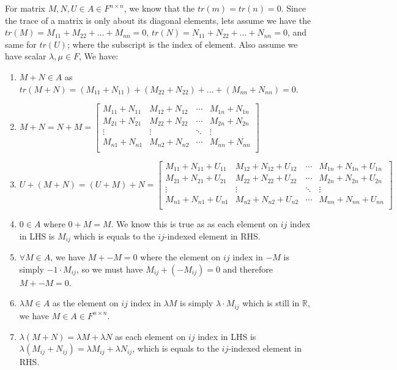 \documentclass[11pt]{article}
\begin{document}
For matrix $M, N, U \in A \in F^{n \times n}$, we know that the $tr(m) = tr(n) = 0$. Since the trace of a matrix is only about its diagonal elements, lets assume we have the $tr(M) = M_{11} + M_{22} + ... +  M_{nn} = 0$, $tr(N) = N_{11} + N_{22} + ... +  N_{nn} = 0$, and same for $tr(U)$; where the subscript is the index of element. Also assume we have scalar $\lambda, \mu \in F$, We have:

\begin{enumerate}
    \item $M + N \in A$ as $tr(M + N) = (M_{11} + N_{11}) + (M_{22} + N_{22}) +  ... + (M_{nn} + N_{nn}) = 0$.
    \item $M + N = N + M = \begin{bmatrix}
        M_{11} + N_{11} & M_{12} + N_{12} & \cdots &M_{1n} + N_{1n} \\
        M_{21} + N_{21} & M_{22} + N_{22} & \cdots &M_{2n} + N_{2n} \\
        \vdots & \vdots & \ddots & \vdots \\
        M_{n1} + N_{n1} & M_{n2} + N_{n2} & \cdots &M_{nn} + N_{nn} \\
    \end{bmatrix}$
    \item $U + (M + N) = (U + M) + N = \begin{bmatrix}
        M_{11} + N_{11}+ U_{11} & M_{12} + N_{12}+ U_{12} & \cdots & M_{1n} + N_{1n}+ U_{1n} \\
        M_{21} + N_{21} + U_{21} & M_{22} + N_{22} + U_{22} & \cdots&  M_{2n} + N_{2n} + U_{2n} \\
        \vdots & \vdots & \ddots & \vdots \\
        M_{n1} + N_{n1}+U_{n1} & M_{n2} + N_{n2}+U_{n2} & \cdots & M_{nn} + N_{nn}+U_{nn} \\
    \end{bmatrix}$
    \item $0 \in A$ where $0 + M = M$. We know this is true as as each element on $ij$ index in LHS is $M_{ij}$ which is equals to the $ij$-indexed element in RHS.
    \item $\forall M \in A$, we have $M + -M = 0$ where the element on $ij$ index in $-M$ is simply $-1 \cdot M_{ij}$, so we must have $M_{ij} + (-M_{ij}) = 0$ and therefore $M + -M = 0$.
    \item $\lambda M \in A$ as the element on $ij$ index in $\lambda M$ is simply $\lambda \cdot M_{ij}$ which is still in $\mathbb{R}$, we have $M \in A \in F^{n \times n}$.
    \item $\lambda (M + N) = \lambda M + \lambda N$ as each element on $ij$ index in LHS is $\lambda(M_{ij} + N_{ij}) = \lambda M_{ij} + \lambda N_{ij}$, which is equals to the $ij$-indexed element in RHS.

\end{enumerate}
\end{document}
